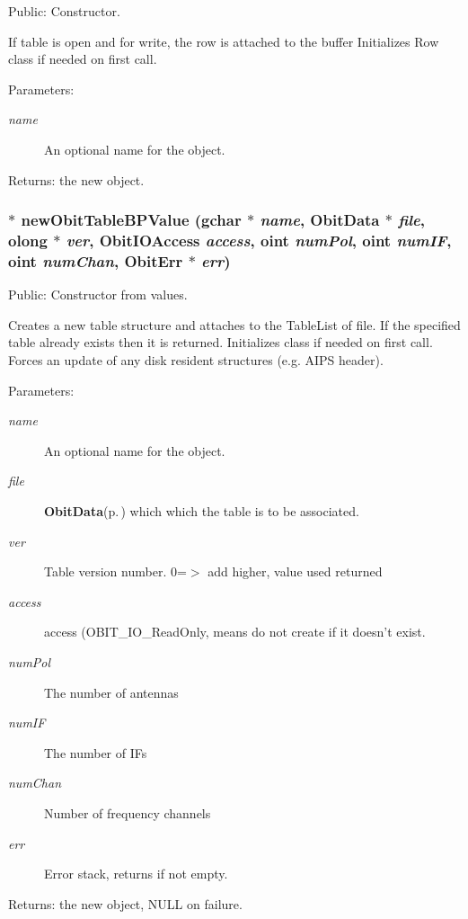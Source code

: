 Public: Constructor. 

If table is open and for write, the row is attached to the buffer Initializes Row class if needed on first call. \begin{Desc}
\item[Parameters:]
\begin{description}
\item[{\em name}]An optional name for the object. \end{description}
\end{Desc}
\begin{Desc}
\item[Returns:]the new object. \end{Desc}
\subsubsection{$\ast$ new\-Obit\-Table\-BPValue (gchar $\ast$ {\em name}, {\bf Obit\-Data} $\ast$ {\em file}, {\bf olong} $\ast$ {\em ver}, Obit\-IOAccess {\em access}, {\bf oint} {\em num\-Pol}, {\bf oint} {\em num\-IF}, {\bf oint} {\em num\-Chan}, {\bf Obit\-Err} $\ast$ {\em err})}\label{ObitTableBP_8h_a12}


Public: Constructor from values. 

Creates a new table structure and attaches to the Table\-List of file. If the specified table already exists then it is returned. Initializes class if needed on first call. Forces an update of any disk resident structures (e.g. AIPS header). \begin{Desc}
\item[Parameters:]
\begin{description}
\item[{\em name}]An optional name for the object. \item[{\em file}]{\bf Obit\-Data}{\rm (p.\,\pageref{structObitData})} which which the table is to be associated. \item[{\em ver}]Table version number. 0=$>$ add higher, value used returned \item[{\em access}]access (OBIT\_\-IO\_\-Read\-Only, means do not create if it doesn't exist. \item[{\em num\-Pol}]The number of antennas \item[{\em num\-IF}]The number of IFs \item[{\em num\-Chan}]Number of frequency channels \item[{\em err}]Error stack, returns if not empty. \end{description}
\end{Desc}
\begin{Desc}
\item[Returns:]the new object, NULL on failure. \end{Desc}
